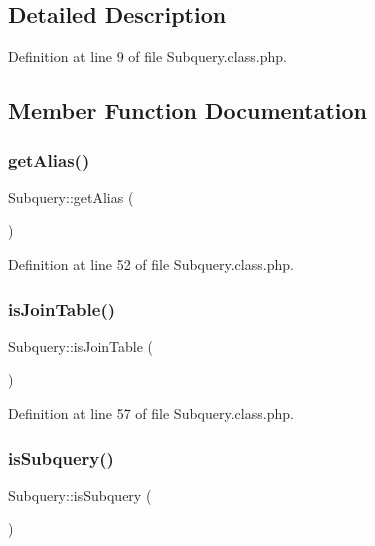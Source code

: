 \subsection{Detailed Description}


Definition at line 9 of file Subquery.\+class.\+php.



\subsection{Member Function Documentation}
\mbox{\label{classSubquery_a6e48c79aecdeae3623d9b67b77e15a0e}} 
\subsubsection{\texorpdfstring{get\+Alias()}{getAlias()}}
{\footnotesize\ttfamily Subquery\+::get\+Alias (\begin{DoxyParamCaption}{ }\end{DoxyParamCaption})}



Definition at line 52 of file Subquery.\+class.\+php.

\mbox{\label{classSubquery_a92a4ae32701020381a7725d625926260}} 
\subsubsection{\texorpdfstring{is\+Join\+Table()}{isJoinTable()}}
{\footnotesize\ttfamily Subquery\+::is\+Join\+Table (\begin{DoxyParamCaption}{ }\end{DoxyParamCaption})}



Definition at line 57 of file Subquery.\+class.\+php.

\mbox{\label{classSubquery_adea0bfe78ba0f6318fa9f181286e1482}} 
\subsubsection{\texorpdfstring{is\+Subquery()}{isSubquery()}}
{\footnotesize\ttfamily Subquery\+::is\+Subquery (\begin{DoxyParamCaption}{ }\end{DoxyParamCaption})}



